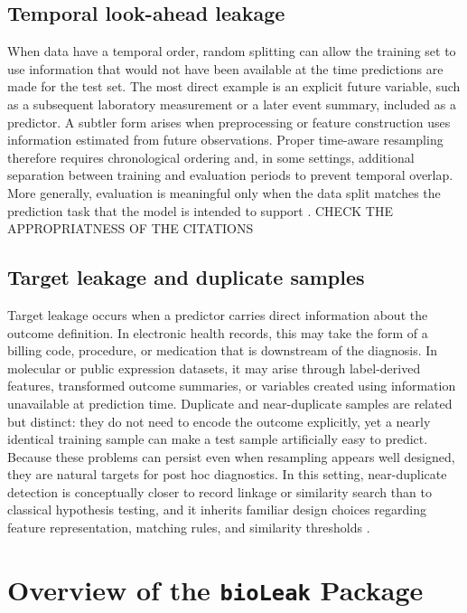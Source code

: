 \documentclass[article]{jss}
\begin{document}
\subsection{Temporal look-ahead leakage}

When data have a temporal order, random splitting can allow the training set to use information that would not have been available at the time predictions are made for the test set. The most direct example is an explicit future variable, such as a subsequent laboratory measurement or a later event summary, included as a predictor. A subtler form arises when preprocessing or feature construction uses information estimated from future observations. Proper time-aware resampling therefore requires chronological ordering and, in some settings, additional separation between training and evaluation periods to prevent temporal overlap. More generally, evaluation is meaningful only when the data split matches the prediction task that the model is intended to support \citep{stone1974, arlot2010, hastie2009}. CHECK THE APPROPRIATNESS OF THE CITATIONS

\subsection{Target leakage and duplicate samples}

Target leakage occurs when a predictor carries direct information about the outcome definition. In electronic health records, this may take the form of a billing code, procedure, or medication that is downstream of the diagnosis. In molecular or public expression datasets, it may arise through label-derived features, transformed outcome summaries, or variables created using information unavailable at prediction time. Duplicate and near-duplicate samples are related but distinct: they do not need to encode the outcome explicitly, yet a nearly identical training sample can make a test sample artificially easy to predict. Because these problems can persist even when resampling appears well designed, they are natural targets for post hoc diagnostics. In this setting, near-duplicate detection is conceptually closer to record linkage or similarity search than to classical hypothesis testing, and it inherits familiar design choices regarding feature representation, matching rules, and similarity thresholds \citep{winkler1999, christen2012, leskovec2014}.

\section[Overview of the bioLeak Package]{Overview of the \texttt{bioLeak} Package}
\end{document}
